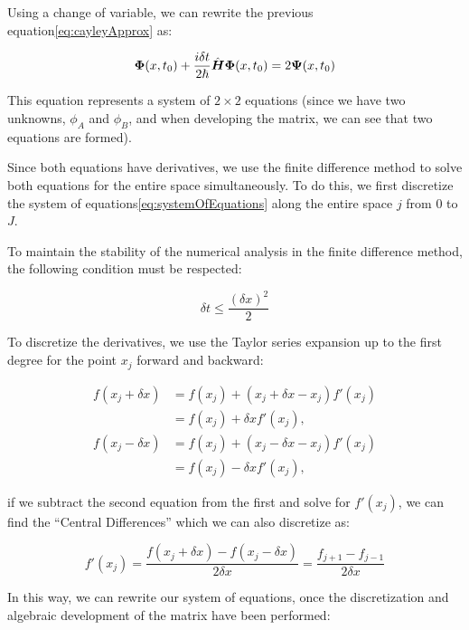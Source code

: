 Using a change of variable, we can rewrite the previous equation\eqref{eq:cayleyApprox} as:

\begin{equation}
    \label{eq:systemOfEquations}
    \mbox{\boldmath $\Phi$}(x,t_0) + \frac{i\delta t}{2\hbar}\hat{\mbox{\boldmath $H$}}\mbox{\boldmath $\Phi$}(x,t_0)=2\mbox{\boldmath $\Psi$}(x,t_0)
\end{equation}

\noindent This equation represents a system of $2\times2$ equations (since we have two unknowns, $\phi_A$ and $\phi_B$, and when developing the matrix, we can see that two equations are formed).

Since both equations have derivatives, we use the finite difference method to solve both equations for the entire space simultaneously.
To do this, we first discretize the system of equations\eqref{eq:systemOfEquations} along the entire space $j$ from $0$ to $J$.

To maintain the stability of the numerical analysis in the finite difference method, the following condition must be respected\cite{Carrillo2015}:

\begin{equation}
    \label{eq:stabilityCondition}
    \delta t \leq \frac{\left( \delta x \right)^2}{2}
\end{equation}

To discretize the derivatives, we use the Taylor series expansion up to the first degree for the point $x_j$ forward and backward:

\begin{align}
    \label{eq:TaylorBeforeAndAfter}
    f(x_j+\delta x)&=f(x_j) + (x_j+\delta x-x_j)f'(x_j)\nonumber\\
    &=f(x_j)+\delta xf'(x_j),\nonumber\\
    f(x_j-\delta x)&=f(x_j) + (x_j-\delta x-x_j)f'(x_j)\nonumber\\
    &=f(x_j)-\delta xf'(x_j),
\end{align}

\noindent if we subtract the second equation from the first and solve for $f'(x_j)$, we can find the ``Central Differences'' which we can also discretize as:

\begin{equation}
    \label{eq:diferenciasCentradas}
    f'(x_j)=\frac{f(x_j+\delta x)-f(x_j-\delta x)}{2\delta x} = \frac{f_{j+1}-f_{j-1}}{2\delta x}
\end{equation}

In this way, we can rewrite our system of equations, once the discretization and algebraic development of the matrix have been performed:

